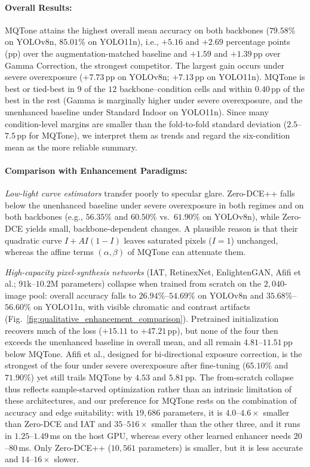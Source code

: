 \documentclass[final,5p,times,twocolumn,authoryear]{elsarticle}
\begin{document}
\paragraph{Overall Results:}
MQTone attains the highest overall mean accuracy on both backbones ($79.58\%$ on YOLOv8n, $85.01\%$ on YOLO11n), i.e., $+5.16$ and $+2.69$ percentage points (pp) over the augmentation-matched baseline and $+1.59$ and $+1.39$\,pp over Gamma Correction, the strongest competitor. The largest gain occurs under severe overexposure ($+7.73$\,pp on YOLOv8n; $+7.13$\,pp on YOLO11n). MQTone is best or tied-best in $9$ of the $12$ backbone--condition cells and within $0.40$\,pp of the best in the rest (Gamma is marginally higher under severe overexposure, and the unenhanced baseline under Standard Indoor on YOLO11n). Since many condition-level margins are smaller than the fold-to-fold standard deviation ($2.5$--$7.5$\,pp for MQTone), we interpret them as trends and regard the six-condition mean as the more reliable summary.

\paragraph{Comparison with Enhancement Paradigms:}
\emph{Low-light curve estimators} transfer poorly to specular glare. Zero-DCE++ falls below the unenhanced baseline under severe overexposure in both regimes and on both backbones (e.g., $56.35\%$ and $60.50\%$ vs.\ $61.90\%$ on YOLOv8n), while Zero-DCE yields small, backbone-dependent changes. A plausible reason is that their quadratic curve $I + A I (1 - I)$ leaves saturated pixels ($I = 1$) unchanged, whereas the affine terms $(\alpha, \beta)$ of MQTone can attenuate them.

\emph{High-capacity pixel-synthesis networks} (IAT, RetinexNet, EnlightenGAN, Afifi et al.; $91\text{k}$--$10.2\text{M}$ parameters) collapse when trained from scratch on the $2{,}040$-image pool: overall accuracy falls to $26.94\%$--$54.69\%$ on YOLOv8n and $35.68\%$--$56.60\%$ on YOLO11n, with visible chromatic and contrast artifacts (Fig.~\ref{fig:qualitative_enhancement_comparison}). Pretrained initialization recovers much of the loss ($+15.11$ to $+47.21$\,pp), but none of the four then exceeds the unenhanced baseline in overall mean, and all remain $4.81$--$11.51$\,pp below MQTone. Afifi et al., designed for bi-directional exposure correction, is the strongest of the four under severe overexposure after fine-tuning ($65.10\%$ and $71.90\%$) yet still trails MQTone by $4.53$ and $5.81$\,pp. The from-scratch collapse thus reflects sample-starved optimization rather than an intrinsic limitation of these architectures, and our preference for MQTone rests on the combination of accuracy and edge suitability: with $19{,}686$ parameters, it is $4.0$--$4.6\times$ smaller than Zero-DCE and IAT and $35$--$516\times$ smaller than the other three, and it runs in $1.25$--$1.49$\,ms on the host GPU, whereas every other learned enhancer needs $20$--$80$\,ms. Only Zero-DCE++ ($10{,}561$ parameters) is smaller, but it is less accurate and $14$--$16\times$ slower.
\end{document}
